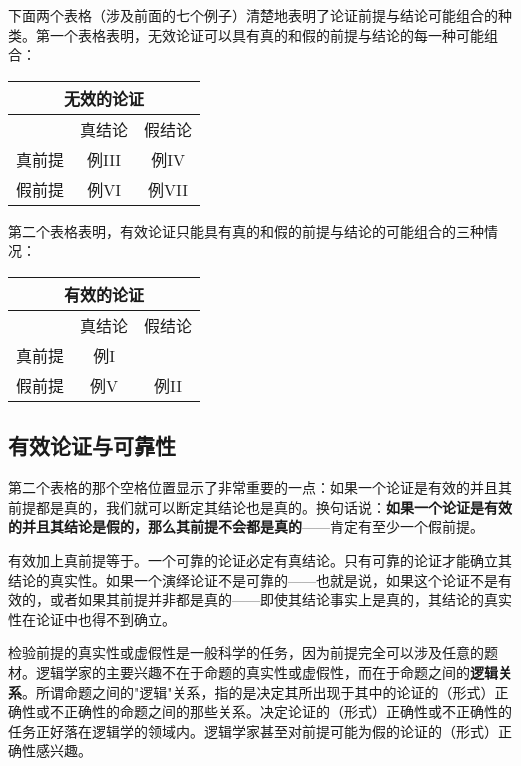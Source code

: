 下面两个表格（涉及前面的七个例子）清楚地表明了论证前提与结论可能组合的种类。第一个表格表明，无效论证可以具有真的和假的前提与结论的每一种可能组合：

\begin{center}
\begin{tabular}{|c|c|c|}
\hline
\multicolumn{3}{|c|}{无效的论证} \\
\hline
 & 真结论 & 假结论 \\
\hline
真前提 & 例III & 例IV \\
\hline
假前提 & 例VI & 例VII \\
\hline
\end{tabular}
\end{center}

第二个表格表明，有效论证只能具有真的和假的前提与结论的可能组合的三种情况：

\begin{center}
\begin{tabular}{|c|c|c|}
\hline
\multicolumn{3}{|c|}{有效的论证} \\
\hline
 & 真结论 & 假结论 \\
\hline
真前提 & 例I & \multicolumn{1}{|c|}{} \\
\hline
假前提 & 例V & 例II \\
\hline
\end{tabular}
\end{center}

\subsection{有效论证与可靠性}

第二个表格的那个空格位置显示了非常重要的一点：如果一个论证是有效的并且其前提都是真的，我们就可以断定其结论也是真的。换句话说：\textbf{如果一个论证是有效的并且其结论是假的，那么其前提不会都是真的}——肯定有至少一个假前提。

有效加上真前提等于。一个可靠的论证必定有真结论。只有可靠的论证才能确立其结论的真实性。如果一个演绎论证不是可靠的——也就是说，如果这个论证不是有效的，或者如果其前提并非都是真的——即使其结论事实上是真的，其结论的真实性在论证中也得不到确立。

检验前提的真实性或虚假性是一般科学的任务，因为前提完全可以涉及任意的题材。逻辑学家的主要兴趣不在于命题的真实性或虚假性，而在于命题之间的\textbf{逻辑关系}。所谓命题之间的"逻辑"关系，指的是决定其所出现于其中的论证的（形式）正确性或不正确性的命题之间的那些关系。决定论证的（形式）正确性或不正确性的任务正好落在逻辑学的领域内。逻辑学家甚至对前提可能为假的论证的（形式）正确性感兴趣。

